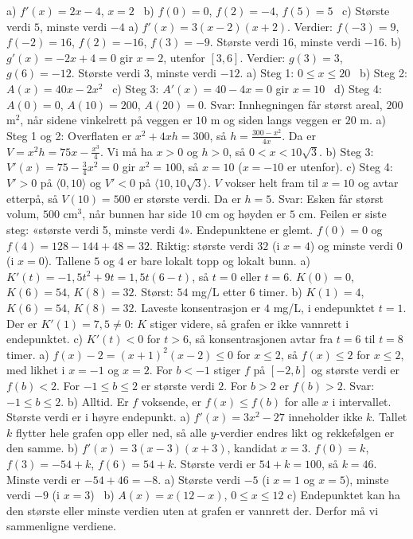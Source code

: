  a) $f'(x) = 2x - 4$, $x = 2$ \ b) $f(0) = 0$, $f(2) = -4$, $f(5) = 5$ \ c) Største verdi $5$, minste verdi $-4$
 a) $f'(x) = 3(x - 2)(x + 2)$. Verdier: $f(-3) = 9$, $f(-2) = 16$, $f(2) = -16$, $f(3) = -9$. Største verdi $16$, minste verdi $-16$.
b) $g'(x) = -2x + 4 = 0$ gir $x = 2$, utenfor $[3, 6]$. Verdier: $g(3) = 3$, $g(6) = -12$. Største verdi $3$, minste verdi $-12$.
 a) Steg 1: $0 \le x \le 20$ \ b) Steg 2: $A(x) = 40x - 2x^2$ \ c) Steg 3: $A'(x) = 40 - 4x = 0$ gir $x = 10$ \ d) Steg 4: $A(0) = 0$, $A(10) = 200$, $A(20) = 0$.
Svar: Innhegningen får størst areal, $200$ m$^2$, når sidene vinkelrett på veggen er $10$ m og siden langs veggen er $20$ m.
 a) Steg 1 og 2: Overflaten er $x^2 + 4xh = 300$, så $h = \frac{300 - x^2}{4x}$. Da er $V = x^2h = 75x - \frac{x^3}{4}$. Vi må ha $x > 0$ og $h > 0$, så $0 < x < 10\sqrt{3}$.
b) Steg 3: $V'(x) = 75 - \frac{3}{4}x^2 = 0$ gir $x^2 = 100$, så $x = 10$ ($x = -10$ er utenfor).
c) Steg 4: $V' > 0$ på $\langle 0, 10\rangle$ og $V' < 0$ på $\langle 10, 10\sqrt{3}\rangle$. $V$ vokser helt fram til $x = 10$ og avtar etterpå, så $V(10) = 500$ er største verdi. Da er $h = 5$.
Svar: Esken får størst volum, $500$ cm$^3$, når bunnen har side $10$ cm og høyden er $5$ cm.
 Feilen er siste steg: «største verdi 5, minste verdi 4». Endepunktene er glemt. $f(0) = 0$ og $f(4) = 128 - 144 + 48 = 32$.
Riktig: største verdi $32$ (i $x = 4$) og minste verdi $0$ (i $x = 0$). Tallene $5$ og $4$ er bare lokalt topp og lokalt bunn.
 a) $K'(t) = -1,5t^2 + 9t = 1,5t(6 - t)$, så $t = 0$ eller $t = 6$. $K(0) = 0$, $K(6) = 54$, $K(8) = 32$.
Størst: $54$ mg/L etter $6$ timer.
b) $K(1) = 4$, $K(6) = 54$, $K(8) = 32$. Laveste konsentrasjon er $4$ mg/L, i endepunktet $t = 1$. Der er $K'(1) = 7,5 \ne 0$: $K$ stiger videre, så grafen er ikke vannrett i endepunktet.
c) $K'(t) < 0$ for $t > 6$, så konsentrasjonen avtar fra $t = 6$ til $t = 8$ timer.
 a) $f(x) - 2 = (x + 1)^2(x - 2) \le 0$ for $x \le 2$, så $f(x) \le 2$ for $x \le 2$, med likhet i $x = -1$ og $x = 2$. For $b < -1$ stiger $f$ på $[-2, b]$ og største verdi er $f(b) < 2$. For $-1 \le b \le 2$ er største verdi $2$. For $b > 2$ er $f(b) > 2$. Svar: $-1 \le b \le 2$.
b) Alltid. Er $f$ voksende, er $f(x) \le f(b)$ for alle $x$ i intervallet. Største verdi er i høyre endepunkt.
 a) $f'(x) = 3x^2 - 27$ inneholder ikke $k$. Tallet $k$ flytter hele grafen opp eller ned, så alle $y$-verdier endres likt og rekkefølgen er den samme.
b) $f'(x) = 3(x - 3)(x + 3)$, kandidat $x = 3$. $f(0) = k$, $f(3) = -54 + k$, $f(6) = 54 + k$. Største verdi er $54 + k = 100$, så $k = 46$. Minste verdi er $-54 + 46 = -8$.
 a) Største verdi $-5$ (i $x = 1$ og $x = 5$), minste verdi $-9$ (i $x = 3$) \ b) $A(x) = x(12 - x)$, $0 \le x \le 12$
c) Endepunktet kan ha den største eller minste verdien uten at grafen er vannrett der. Derfor må vi sammenligne verdiene.


